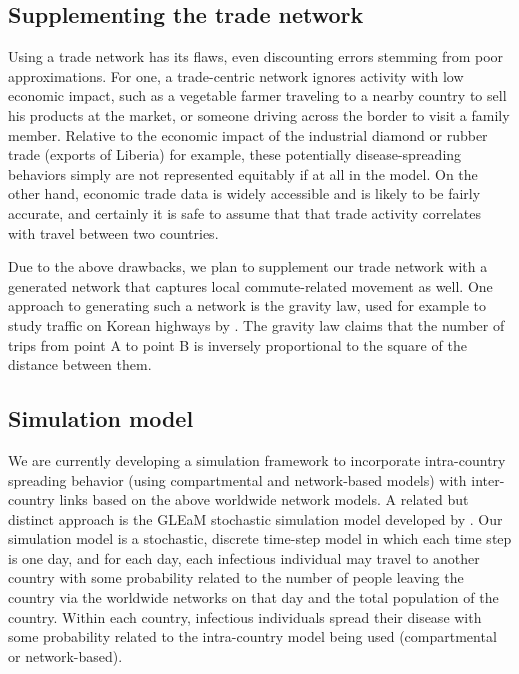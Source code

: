 \documentclass[10pt, journal,onecolumn]{IEEEtran}
\begin{document}
\subsection*{\textbf{Supplementing the trade network}}

Using a trade network has its flaws, even discounting errors stemming from poor approximations.
For one, a trade-centric network ignores activity with low economic impact, such as
a vegetable farmer traveling to a nearby country to sell his products at the market, or someone
driving across the border to visit a family member. Relative to the economic impact of the industrial
diamond or rubber trade (exports of Liberia) for example, these potentially disease-spreading behaviors
simply are not represented equitably if at all in the model. On the other hand, economic trade data is
widely accessible and is likely to be fairly accurate,
and certainly it is safe to assume that that trade activity correlates with travel between two countries.

Due to the above drawbacks, we plan to supplement our trade network with a generated network that
captures local commute-related movement as well. One approach to generating such a network is the gravity law,
used for example to study traffic on Korean highways by \cite{jung2008gravity}. The gravity law
claims that the number of trips from point A to point B is inversely proportional to the square
of the distance between them.

\subsection*{\textbf{Simulation model}}

We are currently developing a simulation framework to incorporate intra-country spreading behavior
(using compartmental and network-based models) with inter-country links based on the above
worldwide network models. A related but distinct approach is the GLEaM stochastic simulation model
developed by \cite{balcan2010modeling}. Our simulation model is a stochastic, discrete time-step
model in which each time step is one day, and for each day, each infectious individual may travel
to another country with some probability related to the number of people leaving the country
via the worldwide networks on that day and the total population of the country. Within each country,
infectious individuals spread their disease with some probability related to the intra-country model
being used (compartmental or network-based).
\end{document}

